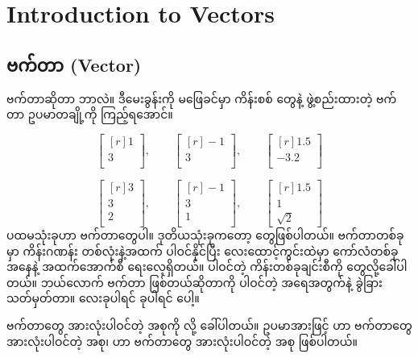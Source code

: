 \chapter{Introduction to Vectors} \label{ch:ch01}

\section{ဗက်တာ (Vector)}
 ဗက်တာဆိုတာ ဘာလဲ။ ဒီမေးခွန်းကို မဖြေခင်မှာ ကိန်းစစ်  တွေနဲ့ ဖွဲ့စည်းထားတဲ့ ဗက်တာ ဥပမာတချို့ကို ကြည့်ရအောင်။ 

\[
\begin{bmatrix*}[r] 1\\ 3\\ \end{bmatrix*}, \qquad
\begin{bmatrix*}[r] -1\\ 3\\ \end{bmatrix*}, \qquad
\begin{bmatrix*}[r] 1.5\\ -3.2\\ \end{bmatrix*}
\]

\[
\begin{bmatrix*}[r] 3\\ 3\\ 2\\\end{bmatrix*}, \qquad
\begin{bmatrix*}[r] -1\\ 3\\ 1\\\end{bmatrix*}, \qquad
\begin{bmatrix*}[r] 1.5\\ 1\\ \sqrt{2}\end{bmatrix*}
\]
ပထမသုံးခုဟာ  ဗက်တာတွေပါ။ ဒုတိယသုံးခုကတော့  တွေဖြစ်ပါတယ်။ ဗက်တာတစ်ခုမှာ ကိန်းဂဏန်း တစ်လုံးနဲ့အထက် ပါဝင်နိုင်ပြီး လေးထောင့်ကွင်းထဲမှာ ကော်လံတစ်ခုအနေနဲ့ အထက်အောက်စီ ရေးလေ့ရှိတယ်။ ပါဝင်တဲ့ ကိန်းတစ်ခုချင်းစီကို  တွေလို့ခေါ်ပါတယ်။ ဘယ်လောက်  ဗက်တာ ဖြစ်တယ်ဆိုတာကို ပါဝင်တဲ့  အရေအတွက်နဲ့ ခွဲခြားသတ်မှတ်တာ။  လေးခုပါရင်   ခုပါရင်  ပေါ့။ 

 ဗက်တာတွေ အားလုံးပါဝင်တဲ့ အစုကို  လို့ ခေါ်ပါတယ်။ ဥပမာအားဖြင့်  ဟာ  ဗက်တာတွေ အားလုံးပါဝင်တဲ့ အစု၊  ဟာ  ဗက်တာတွေ အားလုံးပါဝင်တဲ့ အစု ဖြစ်ပါတယ်။ 

